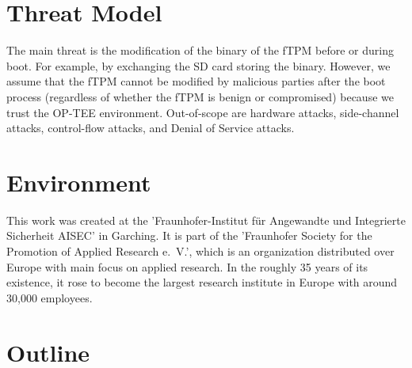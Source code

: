 

\section{Threat Model}

The main threat is the modification of the binary of the fTPM before or during boot. For example, by exchanging the SD card storing the binary.
However, we assume that the fTPM cannot be modified by malicious parties after the boot process (regardless of whether the fTPM is benign or compromised) because we trust the OP-TEE environment.
Out-of-scope are hardware attacks, side-channel attacks, control-flow attacks, and Denial of Service attacks.



\section{Environment}

This work was created at the 'Fraunhofer-Institut für Angewandte und Integrierte Sicherheit AISEC' in Garching.
It is part of the 'Fraunhofer Society for the Promotion of Applied Research e.~V.', which is an organization distributed over Europe with main focus on applied research.
In the roughly 35 years of its existence, it rose to become the largest research institute in Europe with around 30,000 employees.

\section{Outline}

